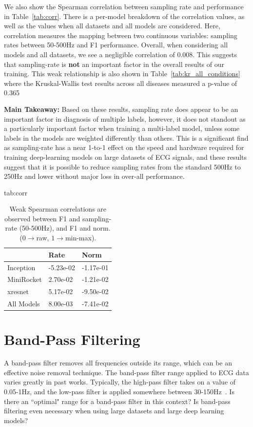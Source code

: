 \documentclass[pmlr,twocolumn]{jmlr}%
\begin{document}
We also show the Spearman correlation between sampling rate and performance in Table~\ref{tab:corr}. There is a per-model breakdown of the correlation values, as well as the values when all datasets and all models are considered. Here, correlation measures the mapping between two continuous variables: sampling rates between 50-500Hz and F1 performance. Overall, when considering all models and all datasets, we see a negligible correlation of $0.008$. This suggests that sampling-rate is \textbf{not} an important factor in the overall results of our training. This weak relationship is also shown in   Table~\ref{tab:kr_all_conditions} where the Kruskal-Wallis test results across all diseases measured a p-value of 0.365


\textbf{Main Takeaway:} Based on these results, sampling rate does appear to be an important factor in diagnosis of multiple labels, however, it does not standout as a particularly important factor when training a multi-label model, unless some labels in the models are weighted differently than others. This is a significant find as sampling-rate has a near 1-to-1 effect on the speed and hardware required for training deep-learning models on large datasets of ECG signals, and these results suggest that it is possible to reduce sampling rates from the standard 500Hz to 250Hz and lower without major loss in over-all performance. 

\begin{table}[htbp]
\floatconts
  {tab:corr}
  {\caption{Weak Spearman correlations are observed between F1 and sampling-rate (50-500Hz), and F1 and norm. ($0\xrightarrow{}$raw, $1\xrightarrow{}$min-max).}}
  {\begin{tabular}{|l|l|l|}
  \hline
   & \bfseries Rate & \bfseries Norm \\\hline
  
  Inception  & -5.23e-02 & -1.17e-01  \\
  MiniRocket &  2.70e-02 & -1.21e-02  \\
  xresnet    & 5.17e-02 & -9.50e-02 \\
  \hline
  All Models & 8.00e-03 & -7.41e-02\\
  \hline
  \end{tabular}}
\end{table}

\section{Band-Pass Filtering}
\label{sec:BandPass}
A band-pass filter removes all frequencies outside its range, which can be an effective noise removal technique. The band-pass filter range applied to ECG data varies greatly in past works. Typically, the high-pass filter takes on a value of 0.05-1Hz, and the low-pass filter is applied somewhere between 30-150Hz~\citep{uwaechia2021comprehensive,luo2010review}. Is there an ``optimal" range for a band-pass filter in this context? Is band-pass filtering even necessary when using large datasets and large deep learning models?
\end{document}
